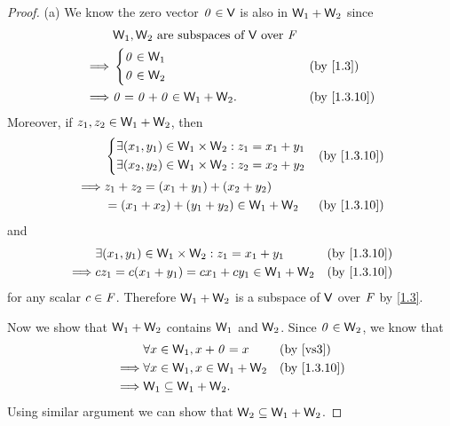 \begin{proof}{(a)}
	We know the zero vector \(\mathit{0} \in \mathsf{V}\) is also in \(\mathsf{W}_1 + \mathsf{W}_2\) since
	\begin{align*}
		         & \W_1, \W_2 \text{ are subspaces of } \V \text{ over } \F                                \\
		\implies & \begin{dcases}
			\zv \in \W_1 \\
			\zv \in \W_2
		\end{dcases}                               &  & \text{(by \cref{1.3})}    \\
		\implies & \zv = \zv + \zv \in \W_1 + \W_2.                         &  & \text{(by \cref{1.3.10})}
	\end{align*}
	Moreover, if \(z_1, z_2 \in \mathsf{W}_1 + \mathsf{W}_2\), then
	\begin{align*}
		         & \begin{dcases}
			\exists (x_1, y_1) \in \W_1 \times \W_2 : z_1 = x_1 + y_1 \\
			\exists (x_2, y_2) \in \W_1 \times \W_2 : z_2 = x_2 + y_2
		\end{dcases}                  &  & \text{(by \cref{1.3.10})} \\
		\implies & z_1 + z_2 = (x_1 + y_1) + (x_2 + y_2)                                      \\
		         & = (x_1 + x_2) + (y_1 + y_2) \in \W_1 + \W_2 &  & \text{(by \cref{1.3.10})}
	\end{align*}
	and
	\begin{align*}
		         & \exists (x_1, y_1) \in \W_1 \times \W_2 : z_1 = x_1 + y_1 &  & \text{(by \cref{1.3.10})} \\
		\implies & cz_1 = c(x_1 + y_1) = cx_1 + cy_1 \in \W_1 + \W_2         &  & \text{(by \cref{1.3.10})}
	\end{align*}
	for any scalar \(c \in \mathit{F}\).
	Therefore \(\mathsf{W}_1 + \mathsf{W}_2\) is a subspace of \(\mathsf{V}\) over \(\mathit{F}\) by \cref{1.3}.

	Now we show that \(\mathsf{W}_1 + \mathsf{W}_2\) contains \(\mathsf{W}_1\) and \(\mathsf{W}_2\).
	Since \(\mathit{0} \in \mathsf{W}_2\), we know that
	\begin{align*}
		         & \forall x \in \W_1, x + \zv = x       &  & \text{(by \ref{vs3})}     \\
		\implies & \forall x \in \W_1, x \in \W_1 + \W_2 &  & \text{(by \cref{1.3.10})} \\
		\implies & \W_1 \subseteq \W_1 + \W_2.
	\end{align*}
	Using similar argument we can show that \(\mathsf{W}_2 \subseteq \mathsf{W}_1 + \mathsf{W}_2\).
\end{proof}

